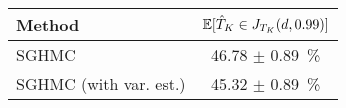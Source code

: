 \begin{tabular}{lc}
\toprule
                Method & $\operatorname{\mathbb{E}}[\hat{T}_K \in J_{T_K}(d, {0.99})]$ \\
\midrule
                 SGHMC &                    46.78 $\pm$ 0.89~\% \\
SGHMC (with var. est.) &                    45.32 $\pm$ 0.89~\% \\
\bottomrule
\end{tabular}
